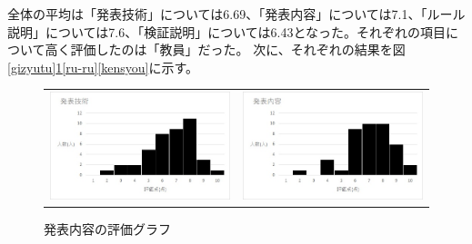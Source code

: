 全体の平均は「発表技術」については6.69、「発表内容」については7.1、「ルール説明」については7.6、「検証説明」については6.43となった。それぞれの項目について高く評価したのは「教員」だった。
次に、それぞれの結果を図\ref{gizyutu}\ref{naiyou}\ref{ru-ru}\ref{kensyou}に示す。

\begin{figure}[h]
 \begin{tabular}{cc}
  \begin{minipage}[h]{0.45\hsize}
  \centering
 \includegraphics[width=0.7\linewidth]{./figure/gizyutu.jpg}
\caption{発表技術の評価グラフ}
\label{gizyutu}
 \end{minipage} &

\begin{minipage}[h]{0.45\hsize}
  \centering
 \includegraphics[width=0.7\linewidth]{./figure/naiyou.jpg}
 \caption{発表内容の評価グラフ}
\label{naiyou}
\end{minipage} 
\end{tabular}
\end{figure}

